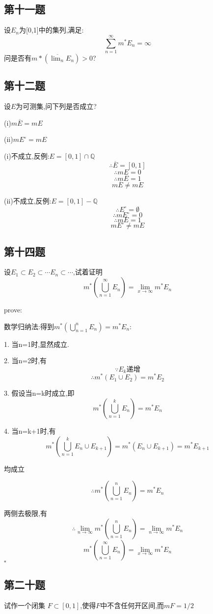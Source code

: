 \documentclass[a4paper]{article}
\begin{document}
    \subsection{第十一题}
    设{$E_n$}为[0,1]中的集列,满足:
    \[\sum_{n=1}^{\infty}m^*E_n=\infty\]
    问是否有$m*(\overline{\lim_{n}}E_n)>0$?

    \subsection{第十二题}
    设$E$为可测集,问下列是否成立?

    (i)$m\overline{E}=mE$
    
    (ii)$mE^{\circ}=mE$

    (i)不成立,反例:$E=[0,1]\cap \mathbb{Q}$
    \[\therefore \overline{E}=[0,1]\]
    \[\therefore mE = 0\]
    \[\therefore m\overline{E}=1\]
    \[m\overline{E}\ne mE\]

    (ii)不成立,反例:$E=[0,1] - \mathbb{Q}$
    \[\therefore E^{\circ} = \emptyset\]
    \[\therefore mE^{\circ} = 0\]
    \[\therefore mE = 1\]
    \[mE^{\circ} \ne mE\]

    \subsection{第十四题}
    设$E_1\subset E_2 \subset \cdots E_n \subset \cdots$,试着证明
    \[m^{*}(\bigcup_{n=1}^{\infty}E_n)= \lim_{x\to \infty} m^{*}E_n\]

    prove:

    数学归纳法:得到$m^{*}(\bigcup_{n=1}^{n}E_n)=m^{*}E_n$:

    1. 当n=1时,显然成立.

    2. 当n=2时,有
    \[\because {E_k}\text{递增}\]
    \[\therefore m^{*}(E_1 \cup E_2)=m^*E_2\]

    3. 假设当n=k时成立,即
    \[m^{*}(\bigcup_{n=1}^{k}E_n)=m^{*}E_n\]

    4. 当n=k+1时,有
    \[m^{*}(\bigcup_{n=1}^{k}E_n \cup E_{k+1})=m^{*}(E_n\cup E_{k+1})=m^{*}E_{k+1}\]
    
    均成立

    \[\therefore m^{*}(\bigcup_{n=1}^{n}E_n)=m^{*}E_n\]

    两侧去极限,有
    \[\therefore \lim_{n\to \infty} m^{*}(\bigcup_{n=1}^{n}E_n)=\lim_{n\to \infty} m^{*}E_n\]
    \[m^{*}(\bigcup_{n=1}^{\infty}E_n)= \lim_{x\to \infty} m^{*}E_n\]
    \hfill $\square$


    \subsection{第二十题}
    试作一个闭集 $F\subset[0,1]$,使得$F$中不含任何开区间,而$mF=1/2$
\end{document}
